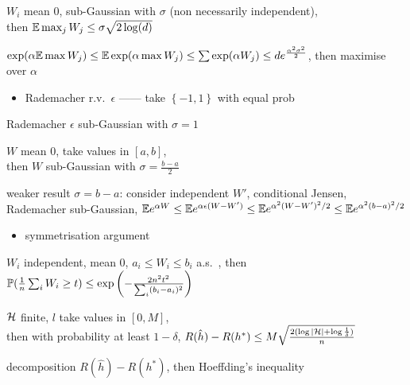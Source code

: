 \begin{prop}
    $W_{i}$ mean 0, sub-Gaussian with $\sigma$ (non necessarily independent),\\ then $\mathbb{E} \max_j W_j \leq \sigma \sqrt{2 \log(d)}$
\end{prop}
\begin{pf}
    $\exp (\alpha \mathbb{E} \max W_j) \leq \mathbb{E} \exp (\alpha \max W_j) \leq \sum \exp (\alpha W_j) \leq de^{\frac{\alpha^2 \sigma^2}{2}}$, then maximise over $\alpha$
\end{pf}

\begin{itemize}
    \item Rademacher r.v.\ $\epsilon$ ------ take $\left\{ -1 ,1 \right\}$ with equal prob
\end{itemize}
\begin{fact}
    Rademacher $\epsilon$ sub-Gaussian with $\sigma = 1$
\end{fact}
\begin{lemma}
    $W$ mean 0, take values in $[a, b]$, \\then $W$ sub-Gaussian with $\sigma = \frac{b- a}{2}$
\end{lemma}
\begin{pf}
    weaker result $\sigma = b - a$: consider independent $W'$, conditional Jensen, Rademacher sub-Gaussian,
    $\mathbb{E} e^{\alpha W} \leq \mathbb{E} e^{\alpha \epsilon(W - W')} \leq \mathbb{E} e^{\alpha^2 (W - W')^2/2} \leq \mathbb{E} e^{\alpha^2 (b - a)^2/2}$
\end{pf}

\begin{itemize}
    \item symmetrisation argument
\end{itemize}

\begin{fact}
    $W_i$ independent, mean 0, $a_i \leq W_i \leq b_i$ a.s.\ , then $\mathbb{P}(\frac{1}{n}\sum_i W_i \geq t) \leq \exp\left( -\frac{2n^{2}t^2}{\sum_i (b_i - a_i)^2} \right)$
\end{fact}

\begin{thm}
    $\mathcal{H}$ finite, $l$ take values in $[0, M]$, \\then with probability at least $1 - \delta$, $R(\hat h) - R(h^*) \leq M \sqrt{\frac{2(\log |\mathcal{H}| + \log \frac{1}{\delta})}{n}}$
\end{thm}
\begin{pf}
    decomposition $R(\hat h) - R(h^*)$, then Hoeffding's inequality
\end{pf}

